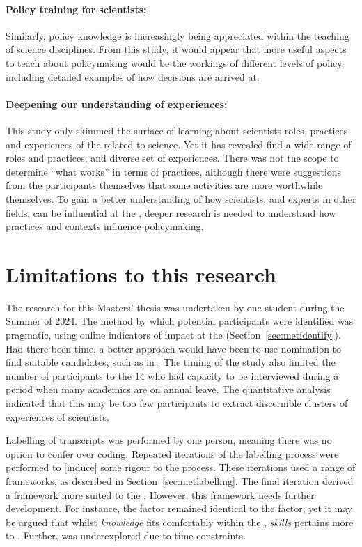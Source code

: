 \paragraph{Policy training for scientists:}
Similarly, policy knowledge is increasingly being appreciated within the teaching of science disciplines. From this study, it would appear that more useful aspects to teach about policymaking would be the workings of different levels of policy, including detailed examples of how decisions are arrived at. 

\paragraph{Deepening our understanding of experiences:}
This study only skimmed the surface of learning about scientists roles, practices and experiences of the \SPI{} related to \CAN{} science. Yet it has revealed find a wide range of roles and practices, and diverse set of experiences. There was not the scope to determine ``what works'' in terms of practices, although there were suggestions from the participants themselves that some activities are more worthwhile themselves. To gain a better understanding of how scientists, and experts in other fields, can be influential at the \SPI, deeper research is needed to understand how practices and contexts influence policymaking.

\section{Limitations to this research}
The research for this Masters' thesis was undertaken by one student during the Summer of 2024. The method by which potential participants were identified was pragmatic, using online indicators of impact at the \SPI{} (Section~\ref{sec:metidentify}). Had there been time, a better approach would have been to use nomination to find suitable candidates, such as in \textcite{HaynesDCRHGS2011}. The timing of the study also limited the number of participants to the 14 who had capacity to be interviewed during a period when many academics are on annual leave. The quantitative analysis indicated that this may be too few participants to extract discernible clusters of experiences of scientists.

Labelling of transcripts was performed by one person, meaning there was no option to confer over coding. Repeated iterations of the labelling process were performed to [induce] some rigour to the process. These iterations used a range of frameworks, as described in Section~\ref{sec:metlabelling}. The final iteration derived a framework more suited to the \SPI. However, this framework needs further development. For instance, the \skiskil{} factor remained identical to the \ISM{} \ismis{} factor, yet it may be argued that whilst \emph{knowledge} fits comfortably within the \skiknow{}, \emph{skills} pertains more to \skiscip. Further, \skiemot{} was underexplored due to time constraints.


